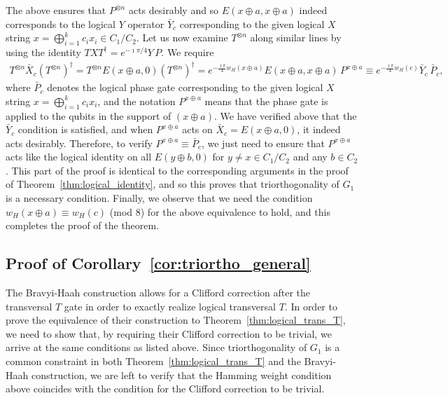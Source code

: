 \documentclass[twoside,romanappendices]{IEEEtran}
\begin{document}
The above ensures that $P^{\otimes n}$ acts desirably and so $E(x \oplus a, x \oplus a)$ indeed corresponds to the logical $Y$ operator $\bar{Y}_c$ corresponding to the given logical $X$ string $x = \bigoplus_{i=1}^{k} c_i x_i \in C_1/C_2$.
Let us now examine $T^{\otimes n}$ along similar lines by using the identity $TXT^{\dagger} = e^{-\imath\pi/4} Y\, P$.
We require
\begin{align}
T^{\otimes n} \bar{X}_c \left( T^{\otimes n} \right)^{\dagger} = T^{\otimes n} E(x \oplus a, 0) \left( T^{\otimes n} \right)^{\dagger} = e^{-\frac{\imath\pi}{4} w_H(x \oplus a)} E(x \oplus a, x \oplus a)\, P^{x \oplus a} 
%
  \equiv e^{-\frac{\imath\pi}{4} w_H(c)} \bar{Y}_c\, \bar{P}_c,
\end{align}
where $\bar{P}_c$ denotes the logical phase gate corresponding to the given logical $X$ string $x = \bigoplus_{i=1}^{k} c_i x_i$, and the notation $P^{x \oplus a}$ means that the phase gate is applied to the qubits in the support of $(x \oplus a)$.
We have verified above that the $\bar{Y}_c$ condition is satisfied, and when $P^{x \oplus a}$ acts on $\bar{X}_c = E(x \oplus a, 0)$, it indeed acts desirably.
Therefore, to verify $P^{x \oplus a} \equiv \bar{P}_c$, we just need to ensure that $P^{x \oplus a}$ acts like the logical identity on all $E(y \oplus b, 0)$ for $y \neq x \in C_1/C_2$ and any $b \in C_2$.
This part of the proof is identical to the corresponding arguments in the proof of Theorem~\ref{thm:logical_identity}, and so this proves that triorthogonality of $G_1$ is a necessary condition.
Finally, we observe that we need the condition $w_H(x \oplus a) \equiv w_H(c)$ (mod $8$) for the above equivalence to hold, and this completes the proof of the theorem. \hfill \IEEEQEDhere




\subsection{Proof of Corollary~\ref{cor:triortho_general}}
\label{sec:proof_triortho_general}


The Bravyi-Haah construction allows for a Clifford correction after the transversal $T$ gate in order to exactly realize logical transversal $T$.
In order to prove the equivalence of their construction to Theorem~\ref{thm:logical_trans_T}, we need to show that, by requiring their Clifford correction to be trivial, we arrive at the same conditions as listed above.
Since triorthogonality of $G_1$ is a common constraint in both Theorem~\ref{thm:logical_trans_T} and the Bravyi-Haah construction, we are left to verify that the Hamming weight condition above coincides with the condition for the Clifford correction to be trivial.
\end{document}
